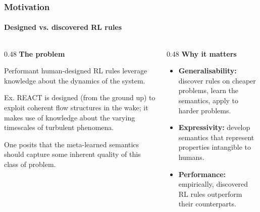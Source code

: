 
\begin{frame}
	\frametitle{Motivation}
	\framesubtitle{Designed vs. discovered RL rules}

	\begin{columns}[T]
		\begin{column}{0.48\linewidth}
			\textbf{The problem}

			Performant human-designed RL rules leverage knowledge about the dynamics of the system.

			Ex. REACT is designed (from the ground up) to exploit coherent flow structures in the wake; it makes use of knowledge about the varying timescales of turbulent phenomena.

			One posits that the meta-learned semantics should capture some inherent quality of this class of problem.
		\end{column}
		\begin{column}{0.48\linewidth}
			\textbf{Why it matters}
			\begin{itemize}
				\item \textbf{Generalisability:} discover rules on cheaper problems, learn the semantics, apply to harder problems.
				\item \textbf{Expressivity:} develop semantics that represent properties intangible to humans.
				\item \textbf{Performance:} empirically, discovered RL rules outperform their counterparts.
			\end{itemize}
		\end{column}
	\end{columns}
\end{frame}